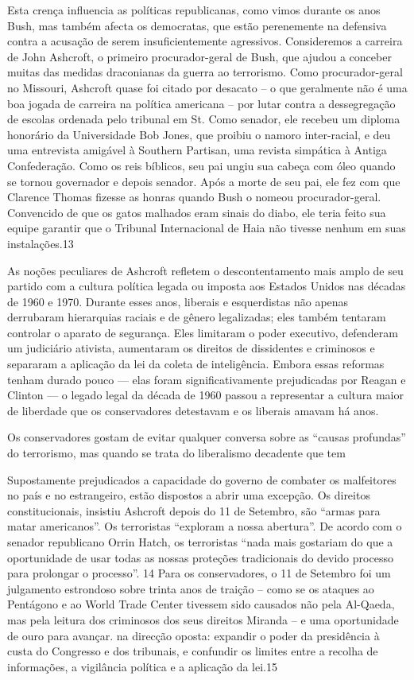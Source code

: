  \par 
Esta crença influencia as políticas republicanas, como vimos durante os anos Bush, mas também afecta os democratas, que estão perenemente na defensiva contra a acusação de serem insuficientemente agressivos. Consideremos a carreira de John Ashcroft, o primeiro procurador-geral de Bush, que ajudou a conceber muitas das medidas draconianas da guerra ao terrorismo. Como procurador-geral no Missouri, Ashcroft quase foi citado por desacato – o que geralmente não é uma boa jogada de carreira na política americana – por lutar contra a dessegregação de escolas ordenada pelo tribunal em St. Como senador, ele recebeu um diploma honorário da Universidade Bob Jones, que proibiu o namoro inter-racial, e deu uma entrevista amigável à Southern Partisan, uma revista simpática à Antiga Confederação. Como os reis bíblicos, seu pai ungiu sua cabeça com óleo quando se tornou governador e depois senador. Após a morte de seu pai, ele fez com que Clarence Thomas fizesse as honras quando Bush o nomeou procurador-geral. Convencido de que os gatos malhados eram sinais do diabo, ele teria feito sua equipe garantir que o Tribunal Internacional de Haia não tivesse nenhum em suas instalações.{\color{blue}13}
 \par 
As noções peculiares de Ashcroft refletem o descontentamento mais amplo de seu partido com a cultura política legada ou imposta aos Estados Unidos nas décadas de 1960 e 1970. Durante esses anos, liberais e esquerdistas não apenas derrubaram hierarquias raciais e de gênero legalizadas; eles também tentaram controlar o aparato de segurança. Eles limitaram o poder executivo, defenderam um judiciário ativista, aumentaram os direitos de dissidentes e criminosos e separaram a aplicação da lei da coleta de inteligência. Embora essas reformas tenham durado pouco — elas foram significativamente prejudicadas por Reagan e Clinton — o legado legal da década de 1960 passou a representar a cultura maior de liberdade que os conservadores detestavam e os liberais amavam há anos.
 \par 
Os conservadores gostam de evitar qualquer conversa sobre as “causas profundas” do terrorismo, mas quando se trata do liberalismo decadente que tem
 \par 
Supostamente prejudicados a capacidade do governo de combater os malfeitores no país e no estrangeiro, estão dispostos a abrir uma excepção. Os direitos constitucionais, insistiu Ashcroft depois do {\color{blue}11} de Setembro, são “armas para matar americanos”. Os terroristas “exploram a nossa abertura”. De acordo com o senador republicano Orrin Hatch, os terroristas “nada mais gostariam do que a oportunidade de usar todas as nossas proteções tradicionais do devido processo para prolongar o processo”. {\color{blue}14} Para os conservadores, o {\color{blue}11} de Setembro foi um julgamento estrondoso sobre trinta anos de traição – como se os ataques ao Pentágono e ao World Trade Center tivessem sido causados ​​não pela Al-Qaeda, mas pela leitura dos criminosos dos seus direitos Miranda – e uma oportunidade de ouro para avançar. na direcção oposta: expandir o poder da presidência à custa do Congresso e dos tribunais, e confundir os limites entre a recolha de informações, a vigilância política e a aplicação da lei.{\color{blue}15}

